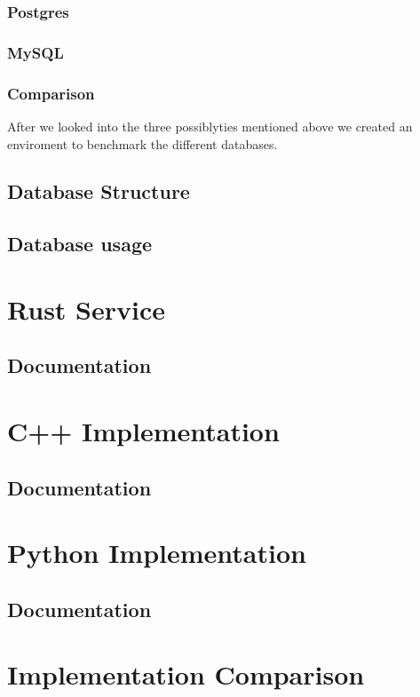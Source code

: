\subsubsection{Postgres}


\subsubsection{MySQL}


\subsubsection{Comparison}
After we looked into the three possiblyties mentioned above we created an enviroment to benchmark the different databases.

\subsection{Database Structure}


\subsection{Database usage}


\section{Rust Service}
\subsection{Documentation}

\section{C++ Implementation}
\subsection{Documentation}

\section{Python Implementation}
\subsection{Documentation}

\section{Implementation Comparison}

\filbreak
